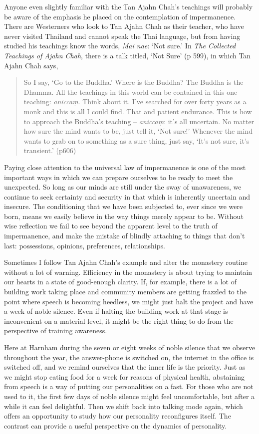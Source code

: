 Anyone even slightly familiar with the Tan Ajahn Chah's teachings will
probably be aware of the emphasis he placed on the contemplation of
impermanence. There are Westerners who look to Tan Ajahn Chah as their
teacher, who have never visited Thailand and cannot speak the Thai
language, but from having studied his teachings know the words,
\emph{Mai nae}: `Not sure.' In \emph{The Collected Teachings of Ajahn Chah}\cite{collected},
there is a talk titled, `Not Sure' (p 599), in which Tan Ajahn Chah says,

\begin{quotation}
So I say, `Go to the Buddha.' Where is the Buddha? The Buddha is the
Dhamma. All the teachings in this world can be contained in this one
teaching: \emph{aniccaṃ}. Think about it. I've searched for over forty
years as a monk and this is all I could find. That and patient
endurance. This is how to approach the Buddha's teaching --
\emph{aniccaṃ}: it's all uncertain. No matter how sure the mind wants to
be, just tell it, `Not sure!' Whenever the mind wants to grab on to
something as a sure thing, just say, `It's not sure, it's transient.'
(p606)
\end{quotation}

Paying close attention to the universal law of impermanence is one of
the most important ways in which we can prepare ourselves to be ready to
meet the unexpected. So long as our minds are still under the sway of
unawareness, we continue to seek certainty and security in that which is
inherently uncertain and insecure. The conditioning that we have been
subjected to, ever since we were born, means we easily believe in the
way things merely appear to be. Without wise reflection we fail to see
beyond the apparent level to the truth of impermanence, and make the
mistake of blindly attaching to things that don't last: possessions,
opinions, preferences, relationships.

Sometimes I follow Tan Ajahn Chah's example and alter the monastery
routine without a lot of warning. Efficiency in the monastery is about
trying to maintain our hearts in a state of good-enough clarity. If, for
example, there is a lot of building work taking place and community
members are getting frazzled to the point where speech is becoming
heedless, we might just halt the project and have a week of noble
silence. Even if halting the building work at that stage is inconvenient
on a material level, it might be the right thing to do from the
perspective of training awareness.

Here at Harnham during the seven or eight weeks of noble silence that we
observe throughout the year, the answer-phone is switched on, the
internet in the office is switched off, and we remind ourselves that the
inner life is the priority. Just as we might stop eating food for a week
for reasons of physical health, abstaining from speech is a way of
putting our personalities on a fast. For those who are not used to it,
the first few days of noble silence might feel uncomfortable, but after
a while it can feel delightful. Then we shift back into talking mode
again, which offers an opportunity to study how our personality
reconfigures itself. The contrast can provide a useful perspective on
the dynamics of personality.

